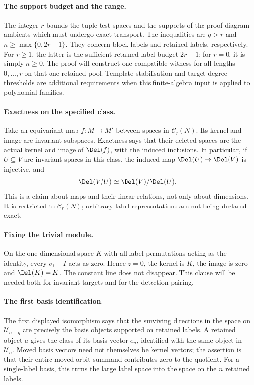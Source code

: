 \paragraph{The support budget and the range.}
The integer $r$ bounds the tuple test spaces and the supports of the
proof-diagram ambients which must undergo exact transport.
The inequalities are $q>r$ and $n\ge\max\{0,2r-1\}$.
They concern block labels and retained labels, respectively. For
$r\ge1$, the latter is the sufficient retained-label budget
$2r-1$; for $r=0$, it is simply $n\ge0$. The proof will construct
one compatible witness for all lengths $0,\ldots,r$ on that one
retained pool. Template stabilisation and target-degree thresholds
are additional requirements when this finite-algebra input is
applied to polynomial families.

\paragraph{Exactness on the specified class.}
Take an equivariant map $f:M\to M'$ between spaces in
$\mathcal C_r(N)$. Its kernel and image are invariant subspaces.
Exactness says that their deleted spaces are the actual kernel and
image of $\Del(f)$, with the induced inclusions. In particular,
if $U\subseteq V$ are invariant spaces in this class, the induced
map $\Del(U)\to\Del(V)$ is injective, and
\[
                  \Del(V/U)\simeq\Del(V)/\Del(U).
\]
This is a claim about maps and their linear relations, not only
about dimensions. It is restricted to $\mathcal C_r(N)$;
arbitrary label representations are not being declared exact.

\paragraph{Fixing the trivial module.}
On the one-dimensional space $K$ with all label permutations acting
as the identity, every $\sigma_i-I$ acts as zero. Hence $z=0$,
the kernel is $K$, the image is zero and $\Del(K)=K$.
The constant line does not disappear. This clause will be needed
both for invariant targets and for the detection pairing.

\paragraph{The first basis identification.}
The first displayed isomorphism says that the surviving directions
in the space on $\mathcal U_{n+q}$ are precisely the basis
objects supported on retained labels. A retained object $u$ gives
the class of its basis vector $e_u$, identified with the same
object in $\mathcal U_n$. Moved basis vectors need not themselves
be kernel vectors; the assertion is that their entire moved-orbit
summand contributes zero to the quotient. For a single-label basis,
this turns the large label space into the space on the $n$
retained labels.

